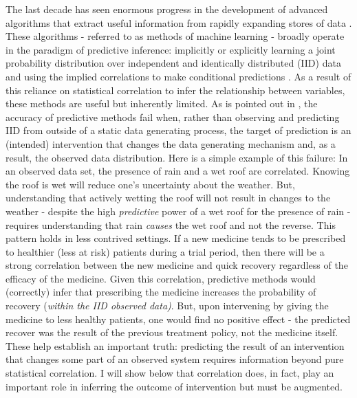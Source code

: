 \documentclass[../main.tex]{subfiles}
\begin{document}
The last decade has seen enormous progress in the development of advanced algorithms that extract useful information from rapidly expanding stores of data \parencite{Lecun2015DeepLearning}. These algorithms - referred to as methods of machine learning - broadly operate in the paradigm of predictive inference: implicitly or explicitly learning a joint probability distribution over independent and identically distributed (IID) data and using the implied correlations to make conditional predictions \parencite{Scholkopf2019CausalityLearning}. As a result of this reliance on statistical correlation to infer the relationship between variables, these methods are useful but inherently limited. As is pointed out in \textcite{Pearl2009CausalOverview}, the accuracy of predictive methods fail when, rather than observing and predicting IID from outside of a static data generating process, the target of prediction is an (intended) intervention that changes the data generating mechanism and, as a result, the observed data distribution. Here is a simple example of this failure: In an observed data set, the presence of rain and a wet roof are correlated. Knowing the roof is wet will reduce one’s uncertainty about the weather. But, understanding that actively wetting the roof will not result in changes to the weather - despite the high \textit{predictive} power of a wet roof for the presence of rain - requires understanding that rain \textit{causes} the wet roof and not the reverse. This pattern holds in less contrived settings. If a new medicine tends to be prescribed to healthier (less at risk) patients during a trial period, then there will be a strong correlation between the new medicine and quick recovery regardless of the efficacy of the medicine. Given this correlation, predictive methods would (correctly) infer that prescribing the medicine increases the probability of recovery (\textit{within the IID observed data)}. But, upon intervening by giving the medicine to less healthy patients, one would find no positive effect - the predicted recover was the result of the previous treatment policy, not the medicine itself. These help establish an important truth: predicting the result of an intervention that changes some part of an observed system requires information beyond pure statistical correlation. I will show below that correlation does, in fact, play an important role in inferring the outcome of intervention but must be augmented.\par
\end{document}

